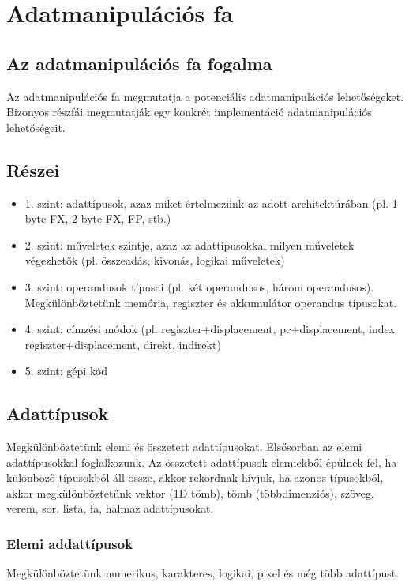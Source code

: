 
\chapter{Adatmanipulációs fa}

\section{Az adatmanipulációs fa fogalma}
Az adatmanipulációs fa megmutatja a potenciális adatmanipulációs lehetőségeket.
Bizonyos részfái megmutatják egy konkrét implementáció adatmanipulációs lehetőségeit.

\section{Részei}
\begin{itemize}
    \item 1. szint: adattípusok, azaz miket értelmezünk az adott architektúrában (pl. 1 byte FX, 2 byte FX, FP, stb.)
    \item 2. szint: műveletek szintje, azaz az adattípusokkal milyen műveletek végezhetők (pl. összeadás, kivonás, logikai műveletek)
    \item 3. szint: operandusok típusai (pl. két operandusos, három operandusos). Megkülönböztetünk memória, regiszter és akkumulátor operandus típusokat.
    \item 4. szint: címzési módok (pl. regiszter+displacement, pc+displacement, index regiszter+displacement, direkt, indirekt)
    \item 5. szint: gépi kód
\end{itemize}

\section{Adattípusok}
Megkülönböztetünk elemi és összetett adattípusokat.
Elsősorban az elemi adattípusokkal foglalkozunk.
Az összetett adattípusok elemiekből épülnek fel, ha különböző típusokból áll össze, akkor rekordnak hívjuk, ha azonos típusokból, akkor megkülönböztetünk vektor (1D tömb), tömb (többdimenziós), szöveg, verem, sor, lista, fa, halmaz adattípusokat.

\subsection{Elemi addattípusok}
Megkülönböztetünk numerikus, karakteres, logikai, pixel és még több adattípust.

